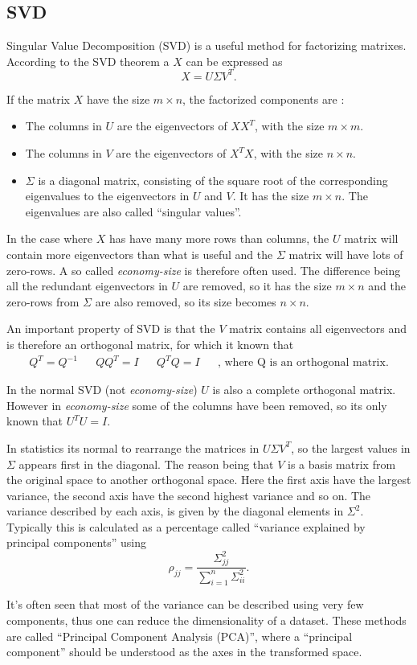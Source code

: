 \subsection{SVD}
Singular Value Decomposition (SVD) is a useful method for factorizing matrixes. According to the SVD theorem a $X$ can be expressed as
\begin{equation}
X=U \Sigma V^{T}.
\label{eq:theory-svd}
\end{equation}

If the matrix $X$ have the size $m \times n$, the factorized components are \cite{introduction-to-data-mining}:
\begin{itemize}
\item The columns in $U$ are the eigenvectors of $X X^T$, with the size $m \times m$.
\item The columns in $V$ are the eigenvectors of $X^T X$, with the size $n \times n$.
\item $\Sigma$ is a diagonal matrix, consisting of the square root of the corresponding eigenvalues to the eigenvectors in $U$ and $V$.
It has the size $m \times n$. The eigenvalues are also called ``singular values''.
\end{itemize}

In the case where $X$ has have many more rows than columns, the $U$ matrix will contain more eigenvectors than what is useful and the $\Sigma$ matrix will have lots of zero-rows.
A so called \textit{economy-size} is therefore often used.
The difference being all the redundant eigenvectors in $U$ are removed, so it has the size $m \times n$ and the zero-rows from $\Sigma$ are also removed, so its size becomes $n \times n$.

An important property of SVD is that the $V$ matrix contains all eigenvectors and is therefore an orthogonal matrix, for which it known that
\begin{align}
Q^T = Q^{-1} && Q Q^T = I && Q^T Q = I && \text{, where Q is an orthogonal matrix.}
\end{align}

In the normal SVD (not \textit{economy-size}) $U$ is also a complete orthogonal matrix.
However in \textit{economy-size} some of the columns have been removed, so its only known that $U^T U = I$.

In statistics its normal to rearrange the matrices in $U \Sigma V^T$, so the largest values in $\Sigma$ appears first in the diagonal.
The reason being that $V$ is a basis matrix from the original space to another orthogonal space.
Here the first axis have the largest variance, the second axis have the second highest variance and so on.
The variance described by each axis, is given by the diagonal elements in $\Sigma^2$.
Typically this is calculated as a percentage called ``variance explained by principal components'' using
\begin{equation}
\rho_{jj} = \frac{\Sigma^2_{jj}}{\sum_{i=1}^n \Sigma^2_{ii}}.
\end{equation}

It's often seen that most of the variance can be described using very few components, thus one can reduce the dimensionality of a dataset.
These methods are called ``Principal Component Analysis (PCA)'', where a ``principal component'' should be understood as the axes in the transformed space.
